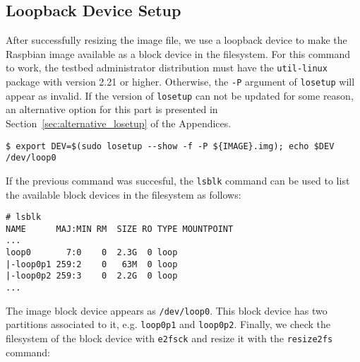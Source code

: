 



\subsection{Loopback Device Setup}
After successfully resizing the image file, we use a loopback device to make
the Raspbian image available as a block device in the filesystem. For this
command to work, the testbed administrator distribution must have the
\texttt{util-linux} package with version 2.21 or higher. Otherwise, the
\texttt{-P} argument of \texttt{losetup} will appear as invalid. If the
version of \texttt{losetup} can not be updated for some reason, an
alternative option for this part is presented in
Section~\ref{sec:alternative_losetup} of the Appendices.

\begin{lstlisting}[]
$ export DEV=$(sudo losetup --show -f -P ${IMAGE}.img); echo $DEV
/dev/loop0
\end{lstlisting}
\FloatBarrier
\vspace{-5mm}

If the previous command was succesful, the \texttt{lsblk} command can be used
to list the available block devices in the filesystem as follows:

\begin{lstlisting}[]
# lsblk
NAME      MAJ:MIN RM  SIZE RO TYPE MOUNTPOINT
...
loop0       7:0    0  2.3G  0 loop
|-loop0p1 259:2    0   63M  0 loop
|-loop0p2 259:3    0  2.2G  0 loop
...
\end{lstlisting}
\FloatBarrier
\vspace{-5mm}

The image block device appears as \texttt{/dev/loop0}. This block device has
two partitions associated to it, e.g. \texttt{loop0p1} and \texttt{loop0p2}.
Finally, we check the filesystem of the block device with \texttt{e2fsck} and
resize it with the \texttt{resize2fs} command:%


